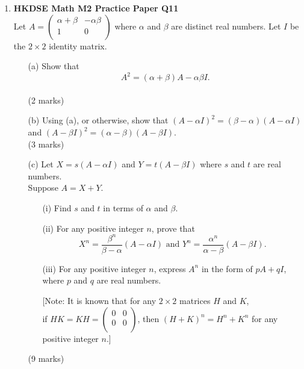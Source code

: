 \documentclass{report}
\begin{document}
\begin{enumerate}
	\item \textbf{HKDSE Math M2 Practice Paper Q11}\\
	Let $A = \begin{pmatrix}
		\alpha + \beta & -\alpha\beta \\
		1 & 0 \\
	\end{pmatrix}$ where $\alpha$ and $\beta$ are distinct real numbers. Let $I$ be the $2\times2$ identity matrix.  
	\begin{enumerate}
		\item [(a)]Show that $$A^2 = (\alpha +\beta)A - \alpha\beta I.$$ \\(2 marks)
		\item [(b)]Using (a), or otherwise, show that $(A - \alpha I)^2 = (\beta - \alpha)(A - \alpha I)$ and $(A - \beta I)^2 = (\alpha - \beta)(A - \beta I)$. \\(3 marks)
		\item [(c)]Let $X = s(A-\alpha I)$ and $Y = t(A-\beta I)$ where $s$ and $t$ are real numbers. \\
		Suppose $A = X + Y$.
		\begin{enumerate}
			\item [(i)]Find $s$ and $t$ in terms of $\alpha$ and $\beta$.
			\item [(ii)]For any positive integer $n$, prove that
			$$X^n = \displaystyle\frac{\beta^n}{\beta - \alpha} (A - \alpha I)\text{ and }Y^n = \displaystyle\frac{\alpha^n}{\alpha - \beta}(A - \beta I).$$
			\item [(iii)]For any positive integer $n$, express $A^n$ in the form of $pA + qI$, where $p$ and $q$ are real numbers. 
			
			[Note: It is known that for any $2\times2 $ matrices $H$ and $K$, \\
			if $HK = KH = \begin{pmatrix}
				0&0\\0&0\\
			\end{pmatrix}$, then $(H+K)^n = H^n + K^n$ for any positive integer $n$.]
		\end{enumerate}
		(9 marks)
	\end{enumerate}

	\newpage


\end{enumerate}
\end{document}
